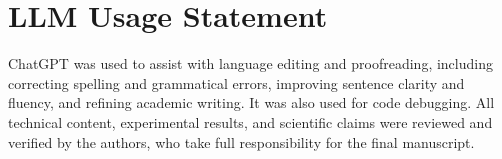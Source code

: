 \section*{LLM Usage Statement}
ChatGPT was used to assist with language editing and proofreading, including correcting spelling and grammatical errors, improving sentence clarity and fluency, and refining academic writing. It was also used for code debugging. All technical content, experimental results, and scientific claims were reviewed and verified by the authors, who take full responsibility for the final manuscript.